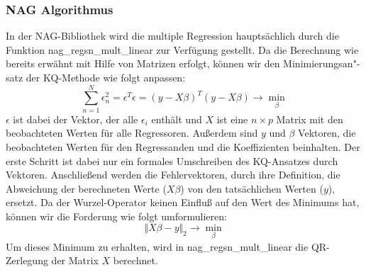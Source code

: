\subsubsection{NAG Algorithmus}

In der NAG-Bibliothek wird die multiple Regression hauptsächlich durch die Funktion nag\_regsn\_mult\_linear zur Verfügung gestellt.
Da die Berechnung wie bereits erwähnt mit Hilfe von Matrizen erfolgt, können wir den Minimierungsan"-satz der KQ-Methode wie folgt anpassen:
\begin{equation*}
  \label{eq:minimization}
  \sum\limits^{N}_{n=1} \epsilon^2_n = \epsilon^T \epsilon = (y - X \beta)^T (y - X \beta) \rightarrow \min\limits_{\beta}
\end{equation*}
$\epsilon$ ist dabei der Vektor, der alle $\epsilon_i$ enthält und $X$ ist eine $n \times p$ Matrix mit den beobachteten Werten für alle Regressoren.
Außerdem sind $y$ und $\beta$ Vektoren, die beobachteten Werten für den Regressanden und die Koeffizienten beinhalten. 
Der erste Schritt ist dabei nur ein formales Umschreiben des KQ-Ansatzes durch Vektoren.
Anschließend werden die Fehlervektoren, durch ihre Definition, die Abweichung der berechneten Werte ($X\beta$) von den tatsächlichen Werten ($y$), ersetzt.
Da der Wurzel-Operator keinen Einfluß auf den Wert des Minimums hat, können wir die Forderung wie folgt umformulieren:
\begin{equation*}
  \label{eq:minimization_general}
  \Vert X\beta - y \Vert_2 \rightarrow \min\limits_{\beta}
\end{equation*}
Um dieses Minimum zu erhalten, wird in nag\_regsn\_mult\_linear die QR-Zerlegung der Matrix $X$ berechnet.


